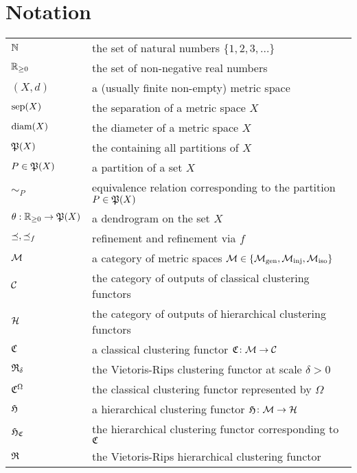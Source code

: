 \chapter{Notation}
\begin{tabular}{ll}
$\N$ & the set of natural numbers $\{1, 2, 3, \dots \}$\\
$\R_{\geq0}$ & the set of non-negative real numbers\\

$(X,d)$ & a (usually finite non-empty) metric space\\
$\sep(X)$ & the separation of a metric space $X$\\
$\diam(X)$ & the diameter of a metric space $X$\\

$\P(X)$ & the containing all partitions of $X$\\
$P \in \P(X)$ & a partition of a set $X$\\
$\sim_P$ & equivalence relation corresponding to the partition $P \in \P(X)$\\

$\theta: \R_{\geq0} \to \P(X)$ & a dendrogram on the set $X$\\

$\refines, \refines_f$ & refinement and refinement via $f$\\

$\M$ & a category of metric spaces $\M \in \{\gen, \inj, \iso\}$\\
$\C$ & the category of outputs of classical clustering functors\\
$\H$ & the category of outputs of hierarchical clustering functors\\

$\Cf$ & a classical clustering functor $\Cf\colon \M \to \C$\\
$\Rf_\delta$ & the Vietoris-Rips clustering functor at scale $\delta>0$\\
$\Cf^\Omega$ & the classical clustering functor represented by $\Omega$\\

$\Hf$ & a hierarchical clustering functor $\Hf\colon \M \to \H$\\
$\Hf_\Cf$ & the hierarchical clustering functor corresponding to $\Cf$\\
$\Rf$ & the Vietoris-Rips hierarchical clustering functor\\

\end{tabular}